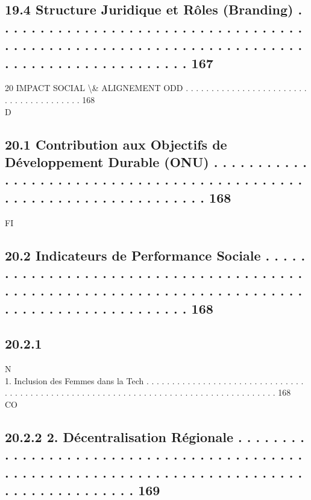 \subsection{19.4    Structure Juridique et Rôles (Branding) . . . . . . . . . . . . . . . . . . . . . . . . . . . . . . . . . . . . . . . . . . . . . . . . . . . . . . . . . . . . . . . . . . . . . . . . . . . . . . . . . . . . . . . . . . 167}
\vspace{0.5em}
20    IMPACT SOCIAL \textbackslash{}& ALIGNEMENT ODD . . . . . . . . . . . . . . . . . . . . . . . . . . . . . . . . . . . . . . . 168\\
\vspace{0.5em}
\vspace{0.5em}
\vspace{0.5em}
\vspace{0.5em}
D\\
\subsection{20.1    Contribution aux Objectifs de Développement Durable (ONU) . . . . . . . . . . . . . . . . . . . . . . . . . . . . . . . . . . . . . . . . . . . . . . . . . . . . . . . . . . . . . . . . . . . . 168}
\vspace{0.5em}
\vspace{0.5em}
\vspace{0.5em}
\vspace{0.5em}
FI\\
\subsection{20.2    Indicateurs de Performance Sociale . . . . . . . . . . . . . . . . . . . . . . . . . . . . . . . . . . . . . . . . . . . . . . . . . . . . . . . . . . . . . . . . . . . . . . . . . . . . . . . . . . . . . . . . . . . . . . 168}
\subsection{20.2.1}
N\\
1. Inclusion des Femmes dans la Tech . . . . . . . . . . . . . . . . . . . . . . . . . . . . . . . . . . . . . . . . . . . . . . . . . . . . . . . . . . . . . . . . . . . . . . . . . . . . . . . . . . . . 168\\
CO\\
\subsection{20.2.2             2. Décentralisation Régionale . . . . . . . . . . . . . . . . . . . . . . . . . . . . . . . . . . . . . . . . . . . . . . . . . . . . . . . . . . . . . . . . . . . . . . . . . . . . . . . . . . . . . . . . . . . 169}
